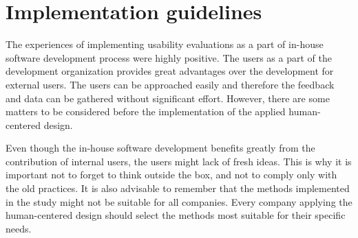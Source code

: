 \documentclass[12pt,a4paper,oneside,pdftex]{report}
\begin{document}








\section{Implementation guidelines}
\label{sec:implementationguidelines}

The experiences of implementing usability evaluations as a part of in-house software development process were highly positive. The users as a part of the development organization provides great advantages over the development for external users. The users can be approached easily and therefore the feedback and data can be gathered without significant effort. However, there are some matters to be considered before the implementation of the applied human-centered design. 

Even though the in-house software development benefits greatly from the contribution of internal users, the users might lack of fresh ideas. This is why it is important not to forget to think outside the box, and not to comply only with the old practices.  
It is also advisable to remember that the methods implemented in the study might not be suitable for all companies. Every company applying the human-centered design should select the methods most suitable for their specific needs. 
\end{document}
